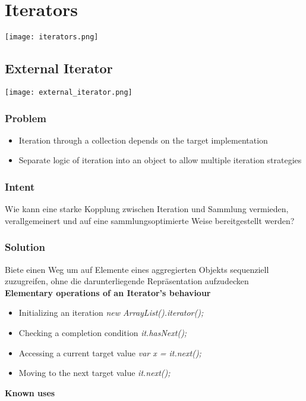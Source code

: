 \section{Iterators}

\texttt{[image: iterators.png]}

\subsection{External Iterator}

\texttt{[image: external\_iterator.png]}

\subsubsection{Problem}
\begin{itemize}
    \item Iteration through a collection depends on the target implementation
    \item Separate logic of iteration into an object to allow multiple iteration strategies
\end{itemize}

\subsubsection{Intent}
Wie kann eine starke Kopplung zwischen Iteration und Sammlung vermieden, verallgemeinert und auf eine sammlungsoptimierte Weise bereitgestellt werden?

\subsubsection{Solution}
Biete einen Weg um auf Elemente eines aggregierten Objekts sequenziell zuzugreifen, ohne die darunterliegende Repräsentation aufzudecken \\

\textbf{Elementary operations of an Iterator's behaviour}
\begin{itemize}
    \item Initializing an iteration \textit{new ArrayList().iterator();}
    \item Checking a completion condition \textit{it.hasNext();}
    \item Accessing a current target value \textit{var x = it.next();}
    \item Moving to the next target value \textit{it.next();}
\end{itemize}
\vspace{10pt}
\textbf{Known uses}

